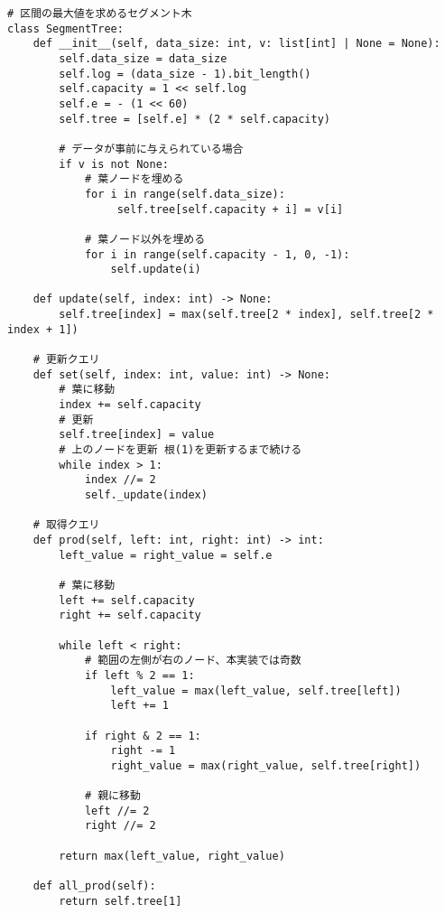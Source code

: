 \documentclass{jlreq}
\begin{document}
\begin{lstlisting}[caption=セグメント木の実装, label=segment, frame=TRBL, label={segment}]
# 区間の最大値を求めるセグメント木
class SegmentTree:
    def __init__(self, data_size: int, v: list[int] | None = None):
        self.data_size = data_size
        self.log = (data_size - 1).bit_length()
        self.capacity = 1 << self.log
        self.e = - (1 << 60)
        self.tree = [self.e] * (2 * self.capacity)

        # データが事前に与えられている場合
        if v is not None:
            # 葉ノードを埋める
            for i in range(self.data_size):
                 self.tree[self.capacity + i] = v[i]
                 
            # 葉ノード以外を埋める 
            for i in range(self.capacity - 1, 0, -1):
                self.update(i)
    
    def update(self, index: int) -> None:
        self.tree[index] = max(self.tree[2 * index], self.tree[2 * index + 1])

    # 更新クエリ
    def set(self, index: int, value: int) -> None:
        # 葉に移動
        index += self.capacity
        # 更新
        self.tree[index] = value
        # 上のノードを更新 根(1)を更新するまで続ける
        while index > 1:
            index //= 2
            self._update(index)
            
    # 取得クエリ
    def prod(self, left: int, right: int) -> int:
        left_value = right_value = self.e
        
        # 葉に移動
        left += self.capacity
        right += self.capacity
        
        while left < right:
            # 範囲の左側が右のノード、本実装では奇数
            if left % 2 == 1:
                left_value = max(left_value, self.tree[left])
                left += 1
            
            if right & 2 == 1:
                right -= 1
                right_value = max(right_value, self.tree[right])
                
            # 親に移動
            left //= 2 
            right //= 2
        
        return max(left_value, right_value)

    def all_prod(self):
        return self.tree[1]
    

\end{lstlisting}

\newpage
\end{document}
